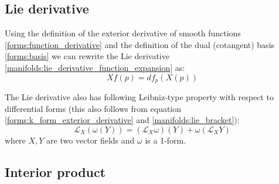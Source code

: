 \subsection{Lie derivative}
	

	\begin{formula}
		Using the definition of the exterior derivative of smooth functions \ref{forms:function_derivative} and the definition of the dual (cotangent) basis \ref{forms:basis} we can rewrite the Lie derivative \ref{manifolds:lie_derivative_function_expansion} as:
		\begin{equation}
			Xf(p)= df_p(X(p))
		\end{equation}
	\end{formula}
	
	\begin{property}
		The Lie derivative also has following Leibniz-type property with respect to differential forms (this also follows from equation \ref{forms:k_form_exterior_derivative} and \ref{manifolds:lie_bracket}):
		\begin{equation}
			\mathcal{L}_X(\omega (Y)) = (\mathcal{L}_X\omega)(Y) + \omega(\mathcal{L}_XY)
		\end{equation}
		where $X, Y$ are two vector fields and $\omega$ is a 1-form.
	\end{property}
	
\subsection{Interior product}

	
